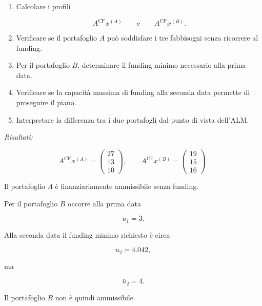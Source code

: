 \begin{exercise}
\begin{enumerate}

\item Calcolare i profili

\[
A^{\mathrm{CF}}x^{(A)}
\qquad\text{e}\qquad
A^{\mathrm{CF}}x^{(B)}.
\]

\item Verificare se il portafoglio $A$ pu\`o soddisfare i tre fabbisogni
senza ricorrere al funding.

\item Per il portafoglio $B$, determinare il funding minimo necessario alla
prima data.

\item Verificare se la capacit\`a massima di funding alla seconda data
permette di proseguire il piano.

\item Interpretare la differenza tra i due portafogli dal punto di vista
dell'ALM.

\end{enumerate}

\end{exercise}

\noindent
\textit{Risultati:}

\[
A^{\mathrm{CF}}x^{(A)}
=
\begin{pmatrix}
27\\
13\\
10
\end{pmatrix},
\qquad
A^{\mathrm{CF}}x^{(B)}
=
\begin{pmatrix}
19\\
15\\
16
\end{pmatrix}.
\]

Il portafoglio $A$ \`e finanziariamente ammissibile senza funding.

Per il portafoglio $B$ occorre alla prima data

\[
u_1=3.
\]

Alla seconda data il funding minimo richiesto \`e circa

\[
u_2=4.042,
\]

ma

\[
\bar u_2=4.
\]

Il portafoglio $B$ non \`e quindi ammissibile.


